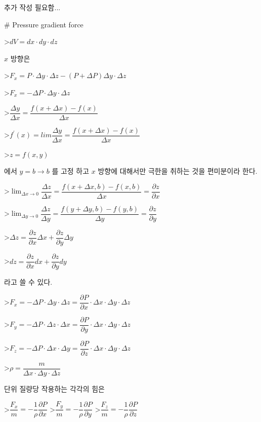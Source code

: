 추가 작성 필요함...


# Pressure gradient force

>$ dV = dx \cdot dy \cdot dz $


$x$ 방향은

>$ F_{x} = P \cdot \Delta y \cdot \Delta z - \left( P + \Delta P \right) \Delta y \cdot \Delta z$

>$ F_{x} = - \Delta P \cdot \Delta y \cdot \Delta z $

>$ \dfrac { \Delta y}{\Delta x } = \dfrac {f\left(x + \Delta x \right) - f\left(x \right)}{ \Delta x}$

>$f^{\prime} \left(x \right) = lim \dfrac { \Delta y}{\Delta x } 
= \dfrac {f\left(x + \Delta x \right) - f\left(x \right)}{ \Delta x}$


>$z = f \left( x, y \right) $ 

에서 $y = b \rightarrow b$ 를 고정 하고 $x$ 방향에 대해서만 극한을 취하는 것을 편미분이라 한다.

>$ \displaystyle \lim_{\Delta x \rightarrow 0} \dfrac { \Delta z}{\Delta x } 
= \dfrac {f\left(x + \Delta x, b \right) - f\left(x, b \right)}{ \Delta x} = \dfrac{\partial z}{\partial x} $

>$\displaystyle \lim_{\Delta y \rightarrow 0} \dfrac { \Delta z}{\Delta y } 
= \dfrac {f\left(y + \Delta y, b \right) - f\left(y, b \right)}{ \Delta y} = \dfrac{\partial z}{\partial y} $

>$ \Delta z = \dfrac{\partial z}{\partial x} \Delta x + \dfrac{\partial z}{\partial y} \Delta y $

>$ dz = \dfrac{\partial z}{\partial x} dx + \dfrac{\partial z}{\partial y} dy $

라고 쓸 수 있다.

>$ F_{x} = - \Delta P \cdot \Delta y \cdot \Delta z 
= \dfrac{\partial P}{\partial x} \cdot \Delta x \cdot \Delta y \cdot \Delta z $

>$ F_{y} = - \Delta P \cdot \Delta z \cdot \Delta x 
= \dfrac{\partial P}{\partial y} \cdot \Delta x \cdot \Delta y \cdot \Delta z $

>$ F_{z} = - \Delta P \cdot \Delta x \cdot \Delta y 
= \dfrac{\partial P}{\partial z} \cdot \Delta x \cdot \Delta y \cdot \Delta z $

>$ \rho = \dfrac {m}{\Delta x \cdot \Delta y \cdot \Delta z} $ 

단위 질량당 작용하는 각각의 힘은

>$ \dfrac {F_{x}}{m} = - \dfrac{1}{\rho} \dfrac{\partial P}{\partial x} $ 
>$ \dfrac {F_{y}}{m} = - \dfrac{1}{\rho} \dfrac{\partial P}{\partial y} $ 
>$ \dfrac {F_{z}}{m} = - \dfrac{1}{\rho} \dfrac{\partial P}{\partial z} $ 

